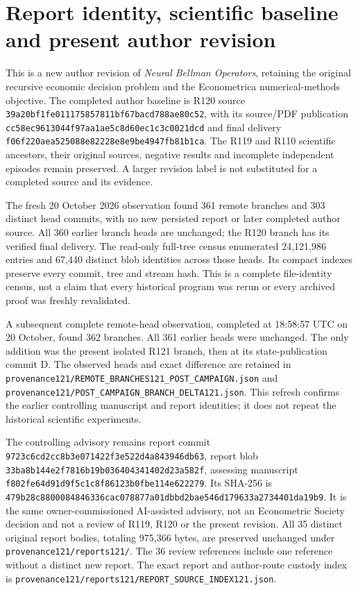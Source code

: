 \section{Report identity, scientific baseline and present author revision}
This is a new author revision of \emph{Neural Bellman Operators}, retaining
the original recursive economic decision problem and the Econometrica
numerical-methods objective. The completed author baseline is R120 source
\nolinkurl{39a20bf1fe011175857811bf67bacd788ae80c52}, with its source/PDF
publication \nolinkurl{cc58ec9613044f97aa1ae5c8d60ec1c3c0021dcd} and final
delivery \nolinkurl{f06f220aea525088e82228e8e9be4947fb81b1ca}.
The R119 and R110 scientific ancestors, their original sources, negative
results and incomplete independent episodes remain preserved. A larger
revision label is not substituted for a completed source and its evidence.

The fresh 20 October 2026 observation found 361 remote branches and
303 distinct head commits, with no new persisted report or later completed
author source. All 360 earlier branch heads are unchanged; the R120 branch
has its verified final delivery. The read-only full-tree census enumerated
24,121,986 entries and 67,440 distinct blob identities across those heads.
Its compact indexes preserve every commit, tree and stream hash. This is
a complete file-identity census, not a claim that every historical program
was rerun or every archived proof was freshly revalidated.

A subsequent complete remote-head observation, completed at
18:58:57 UTC on 20 October, found 362 branches. All 361 earlier heads
were unchanged. The only addition was the present isolated R121 branch,
then at its state-publication commit D. The observed heads and exact
difference are retained in
\nolinkurl{provenance121/REMOTE_BRANCHES121_POST_CAMPAIGN.json} and
\nolinkurl{provenance121/POST_CAMPAIGN_BRANCH_DELTA121.json}.
This refresh confirms the earlier controlling manuscript and report
identities; it does not repeat the historical scientific experiments.

The controlling advisory remains report commit
\nolinkurl{9723c6cd2cc8b3e071422f3e522d4a843946db63}, report blob
\nolinkurl{33ba8b144e2f7816b19b036404341402d23a582f}, assessing manuscript
\nolinkurl{f802fe64d91d9f5c1c8f86123b0fbe114e622279}.
Its SHA-256 is
\nolinkurl{479b28c8800084846336cac078877a01dbbd2bae546d179633a2734401da19b9}.
It is the same owner-commissioned AI-assisted advisory, not an Econometric
Society decision and not a review of R119, R120 or the present revision.
All 35 distinct original report bodies, totaling 975,366 bytes, are
preserved unchanged under \nolinkurl{provenance121/reports121/}.
The 36 review references include one reference without a distinct new report.
The exact report and author-route custody index is
\nolinkurl{provenance121/reports121/REPORT_SOURCE_INDEX121.json}.

